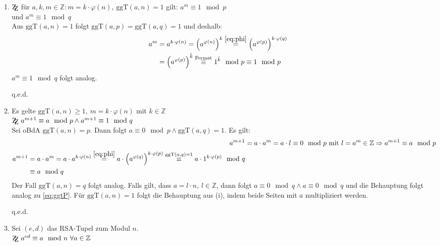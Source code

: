 \documentclass[DIN, pagenumber=false, fontsize=11pt, parskip=half]{scrartcl}
\newcommand{\Z}[0]{\mathbb{Z}}
\newcommand{\ZZ}{\mathrm{Z\kern-.3em\raise-0.5ex\hbox{Z}}}
\newcommand{\ggt}{\text{ggT}}
\newcommand{\congTo}[3][]{\stackrel{#1}{\equiv} #2\mod #3}
\newcommand{\Qed}{\begin{flushright}
    q.e.d.
\end{flushright}}
\begin{document}
    \begin{enumerate}[label=(\roman*)]
        \item $\ZZ$ für $a, k, m \in \Z :  m = k \cdot \varphi(n), \ \ggt(a, n) = 1$ gilt: $a^m \congTo{1}{p}$ \\ und $a^m \congTo{1}{q}$ \\
              Aus $\ggt(a, n) = 1$ folgt $\ggt(a, p) = \ggt(a, q) = 1$ und deshalb:
              \begin{align}
                  a^m &= a^{k \cdot \varphi(n)} = \left(a^{\varphi(n)}\right)^k \stackrel{\ref{eq:phi}}{=} \left(a^{\varphi(p)}\right)^{k \cdot \varphi(q)} \\
                  &= \left(a^{\varphi(p)}\right)^{\tilde{k}} \congTo[\text{Fermat}]{1^{\tilde{k}}}{p} \congTo{1}{p}
              \end{align}
              $a^m \congTo{1}{q}$ folgt analog. \Qed
        \item Es gelte $\ggt(a, n) \geq 1, \ m = k \cdot \varphi(n)$ mit $k \in \Z$ \\
              $\ZZ \ a^{m + 1} \congTo{a}{p} \wedge a^{m + 1} \congTo{1}{q}$ \\
              Sei oBdA $\ggt(a, n) = p$. Dann folgt $a \congTo{0}{p} \wedge \ggt(a, q) = 1$. Es gilt:
              \begin{align}
                  \label{eq:ggtP}
                  a^{m + 1} &= a \cdot a^m = a \cdot l \congTo{0}{p} \ \text{mit} \ l = a^m \in \Z \Rightarrow a^{m + 1} \congTo{a}{p} \\
                  \begin{split}
                      a^{m + 1} &= a \cdot a^m = a \cdot a^{k \cdot \varphi(n)} \stackrel{\ref{eq:phi}}{=} a \cdot \left(a^{\varphi(q)}\right)^{k \cdot \varphi(p)}
                      \congTo[\ggt(a, q) = 1]{a \cdot 1^{k \cdot \varphi(p)}}{q} \\ &\congTo{a}{q} 
                  \end{split}
              \end{align}
              Der Fall $\ggt(a, n) = q$ folgt analog. Falls gilt, dass $a = l \cdot n, \ l \in \Z$, dann folgt $a \congTo{0}{q} \wedge a \congTo{0}{q}$ und
              die Behauptung folgt analog zu \cref{eq:ggtP}. Für $\ggt(a, n) = 1$ folgt die Behauptung aus (i), indem beide Seiten mit $a$ multipliziert werden. \Qed
        \item Sei $(e, d)$ das RSA-Tupel zum Modul $n$. \\ $\ZZ \ a^{ed} \congTo{a}{n} \ \forall a \in \Z$ \\

\end{enumerate}
\end{document}
